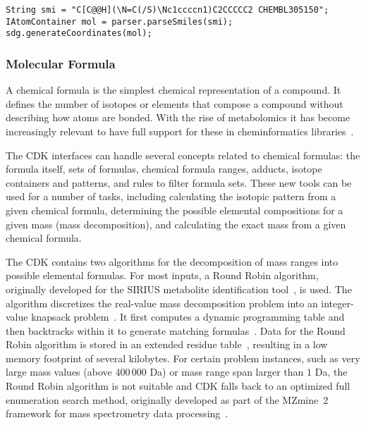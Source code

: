 \documentclass[doublespacing]{bmcart}
\begin{document}
\vspace{0.2cm}
\begin{verbatim}
String smi = "C[C@@H](\N=C(/S)\Nc1ccccn1)C2CCCCC2 CHEMBL305150";
IAtomContainer mol = parser.parseSmiles(smi);
sdg.generateCoordinates(mol);
\end{verbatim}
\vspace{0.2cm}

 \subsubsection*{Molecular Formula}

A chemical formula is the simplest chemical representation of a
compound.  It defines the number of isotopes or elements that
compose  a compound without describing how atoms
are bonded. With the rise of metabolomics it has become increasingly
relevant to have full support for these in cheminformatics
libraries~\cite{Wolf2010,RojasCherto2011,Pluskal2012,Pluskal2010,Duhrkop2015}.

The CDK interfaces can handle several concepts related to chemical formulas:
the formula itself, sets of formulas, chemical formula ranges, adducts, isotope
containers and patterns, and rules to filter formula sets. These new tools can
be used for a number of tasks, including calculating the isotopic pattern from
a given chemical formula, determining the possible elemental compositions for a
given mass (mass decomposition), and calculating the exact mass from a given
chemical formula.

The CDK contains two algorithms for the decomposition of mass ranges into
possible elemental formulas. For most inputs, a Round Robin algorithm,
originally developed for the SIRIUS metabolite identification
tool~\cite{Bocker2009}, is used. The algorithm discretizes the real-value mass
decomposition problem into an integer-value knapsack
problem~\cite{Martello1990}. It first computes a dynamic programming table and
then backtracks within it to generate matching formulas~\cite{Duehrkop2013,
Boecker2008}. Data for the Round Robin algorithm is stored in an extended
residue table~\cite{Bocker2005}, resulting in a low memory footprint of several
kilobytes. For certain problem instances, such as very large mass values (above
$400\,000$ Da) or mass range span larger than $1$ Da, the Round Robin algorithm
is not suitable and CDK falls back to an optimized full enumeration search
method, originally developed as part of the MZmine~2 framework for mass
spectrometry data processing~\cite{Pluskal2012, Pluskal2010}.
\end{document}
